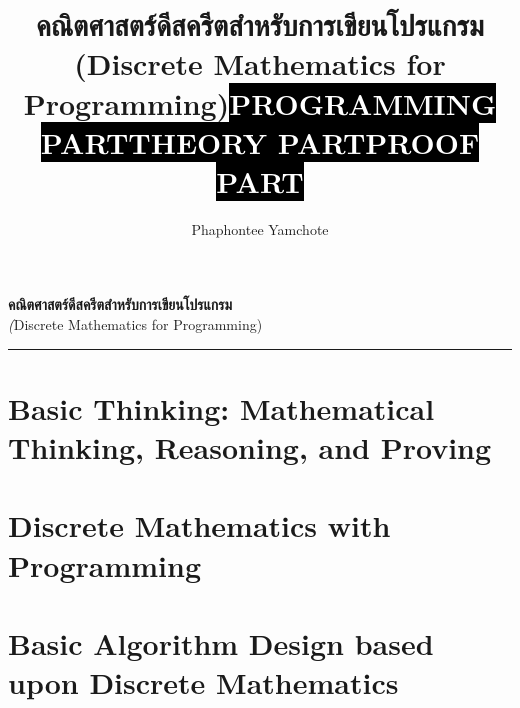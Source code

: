\documentclass[12pt,twoside,openright]{book}
\title{คณิตศาสตร์ดีสครีตสำหรับการเขียนโปรแกรม\\(Discrete Mathematics for Programming)}
\author{Phaphontee Yamchote}
\date{}
\title{\sffamily\colorbox{black}{\bfseries\textcolor{white}{\Large PROGRAMMING PART}}}
\title{\sffamily\colorbox{black}{\bfseries\textcolor{white}{\Large THEORY PART}}}
\title{\sffamily\colorbox{black}{\bfseries\textcolor{white}{\Large PROOF PART}}}
\theoremstyle{definition}
\begin{document}
\begin{titlepage}
	\raggedleft	
	\hspace{.025\textwidth}
	\parbox[b]{\textwidth}{
		\vspace{1.5cm}
		{\Huge\bfseries คณิตศาสตร์ดีสครีตสำหรับการเขียนโปรแกรม}                \\[20pt] 
		{\Large\textit (Discrete Mathematics for Programming)}
		}
	\vspace{1cm}  
	\vfill
	\rule{1pt}{.15\textheight}
	\hspace{.025\textwidth}
\end{titlepage}
	\frontmatter
	\tableofcontents

	\mainmatter

    
%    
%    
   	\part{Basic Thinking: Mathematical Thinking, Reasoning, and Proving}
   	
   	
%   	
   	
   	
%   	
%   	
   	\part{Discrete Mathematics with Programming}
   	
   	
   	
   	
   	
   	
   	
   	
%   	
	
	\part{Basic Algorithm Design based upon Discrete Mathematics}
	
	
	\backmatter
%	
	\printindex
\end{document}
